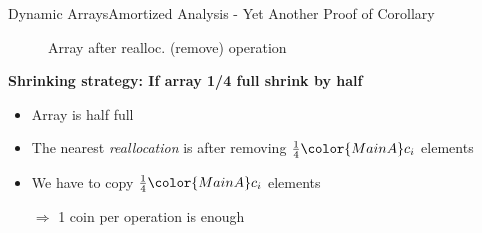 \begin{frame}{Dynamic Arrays}{Amortized Analysis -
    Yet Another Proof of Corollary}
  \vspace{-2.0em}
  \begin{figure}[!h]%
    \def\FSAsize{14}\def\FSAelements{0}%
    \def\FSAcopy{7}\def\FSAdelete{1}\def\FSAinsert{0}%
    \def\FSAcopyarrow{1}%
    \def\FSAinsertarrow{1}%
    \def\FSAlabelsize{\raisebox{1.75em}{$\begin{array}{c}
        {\color{MainA}s_{i-1}-1}\\
        \text{old elements}
        \end{array}$}}%
    \def\FSAlabelinsertcapacity{removed elements}%
    \def\FSAlabelcapacity{${\color{MainA}c_i}
      = \frac{1}{2} \cdot {\color{MainA}c_{i-1}}$}%
    \vspace{-0.5em}%
    \caption{Array after realloc. (remove) operation}
    \label{fig:dynamic_fields:amortized_analysis:yapoc_array_shrink2}
  \end{figure}
  \vspace*{-1.0em}
  \textbf{Shrinking strategy: If array 1/4 full shrink by half}
  \begin{itemize}
    \item
      Array is half full
    \item
      The nearest \textit{reallocation} is after removing
      $\frac{1}{4} {\color{MainA}c_i}$ elements
    \item
      We have to copy $\frac{1}{4} {\color{MainA}c_i}$ elements
    \item[$\Rightarrow$]
      1 coin per operation is enough
  \end{itemize}
\end{frame}

